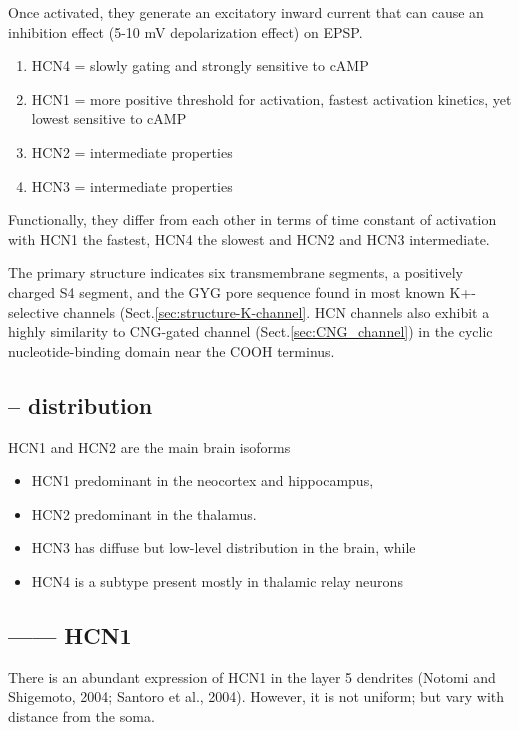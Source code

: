 Once activated, they generate an excitatory inward current that can cause an
inhibition effect (5-10 mV depolarization effect) on EPSP. 
\begin{enumerate}
  \item HCN4 = slowly gating and strongly sensitive to cAMP
  \item HCN1 = more positive threshold for activation, fastest activation
  kinetics, yet lowest sensitive to cAMP
  \item HCN2 = intermediate properties
  \item HCN3 = intermediate properties
\end{enumerate}
Functionally, they differ from each other in terms of time constant of
activation with HCN1 the fastest, HCN4 the slowest and HCN2 and HCN3
intermediate.


The primary structure indicates six transmembrane segments, a positively charged
S4 segment, and the GYG pore sequence found in most known K+-selective channels
(Sect.\ref{sec:structure-K-channel}.
HCN channels also exhibit a highly similarity to CNG-gated channel
(Sect.\ref{sec:CNG_channel}) in the cyclic nucleotide-binding domain near the
COOH terminus.

\subsection{-- distribution}
\label{sec:HCN-channels-HCN1}

HCN1 and HCN2 are the main brain isoforms
\begin{itemize}
  \item HCN1 predominant in the neocortex and hippocampus, 
  

  \item HCN2 predominant in the thalamus.
  
  
  \item HCN3 has diffuse but low-level distribution in the brain, while 
  
  \item HCN4 is a subtype present mostly in thalamic relay neurons
\end{itemize}

\subsection{------ HCN1}	
\label{sec:HCN1-distribution-pyramidal-neuron}

There is an abundant expression of HCN1 in the layer 5 dendrites (Notomi and
Shigemoto, 2004; Santoro et al., 2004). However, it is not uniform; but vary
with distance from the soma.

